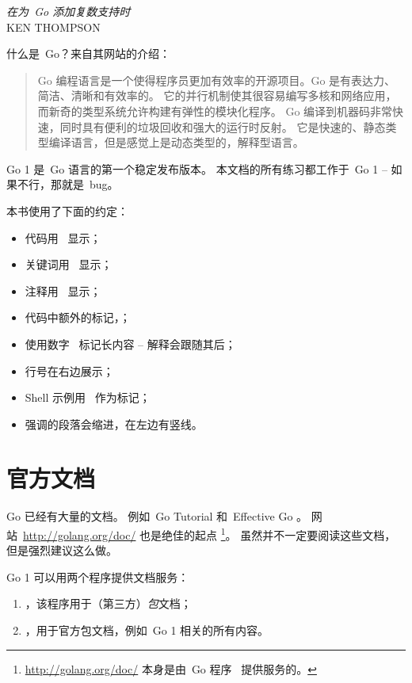 {\textit{在为~Go 添加复数支持时}\\ \textsc{KEN THOMPSON}}

\noindent{}什么是~Go？来自其网站\cite{go_web}的介绍：
\begin{quote}
Go 编程语言是一个使得程序员更加有效率的开源项目。Go 是有表达力、简洁、清晰和有效率的。
它的并行机制使其很容易编写多核和网络应用，而新奇的类型系统允许构建有弹性的模块化程序。
Go 编译到机器码非常快速，同时具有便利的垃圾回收和强大的运行时反射。
它是快速的、静态类型编译语言，但是感觉上是动态类型的，解释型语言。
\end{quote}

Go 1 是~Go 语言的第一个稳定发布版本。
本文档的所有练习都工作于~Go 1 -- 如果不行，那就是~bug。

本书使用了下面的约定：
\begin{itemize}
\item 代码用~ 显示；
\item 关键词用~ 显示；
\item 注释用~ 显示；
\item 代码中额外的标记，；
\item 使用数字~ 标记长内容 -- 解释会跟随其后；
\item 行号在右边展示；
\item Shell 示例用~\pr{} 作为标记；
\item 强调的段落会缩进，在左边有竖线。
\end{itemize}

\section{官方文档}
Go 已经有大量的文档。
例如~Go Tutorial \cite{go_tutorial} 和~Effective Go \cite{effective_go}。
网站~\url{http://golang.org/doc/} 也是绝佳的起点 
\footnote{\url{http://golang.org/doc/} 本身是由~Go 程序~ 提供服务的。}。
虽然并不一定要阅读这些文档，但是强烈建议这么做。

Go 1 可以用两个程序提供文档服务：
\begin{enumerate}
\item {}，该程序用于（第三方）\emph{包}文档；
\item {}，用于官方包文档，例如~Go 1 相关的所有内容。
\end{enumerate}

